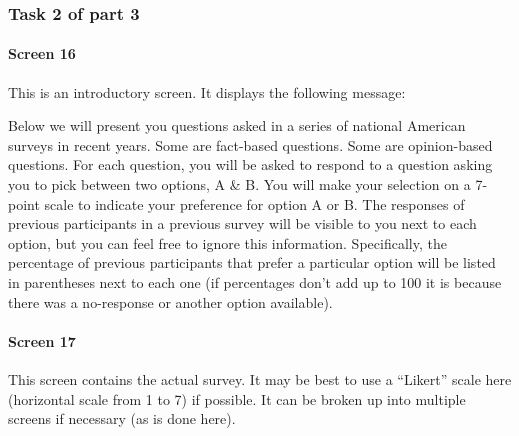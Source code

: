 \documentclass[11pt]{article}
\begin{document}
\subsubsection{Task 2 of part 3}

\paragraph{Screen 16} This is an introductory screen. It displays the following message:

\begin{tcolorbox}
Below we will present you questions asked in a series of national American surveys in recent years. Some are fact-based questions.  Some are opinion-based questions.  For each question, you will be asked to respond to a question asking you to pick between two options, A \& B. You will make your selection on a 7-point scale to indicate your preference for option A or B. The responses of previous participants in a previous survey will be visible to you next to each option, but you can feel free to ignore this information.  Specifically, the percentage of previous participants that prefer a particular option will be listed in parentheses next to each one (if percentages don't add up to 100 it is because there was a no-response or another option available).
\end{tcolorbox}

\paragraph{Screen 17} This screen contains the actual survey. It may be best to use a ``Likert'' scale here (horizontal scale from 1 to 7) if possible. It can be broken up into multiple screens if necessary (as is done here).
\end{document}
